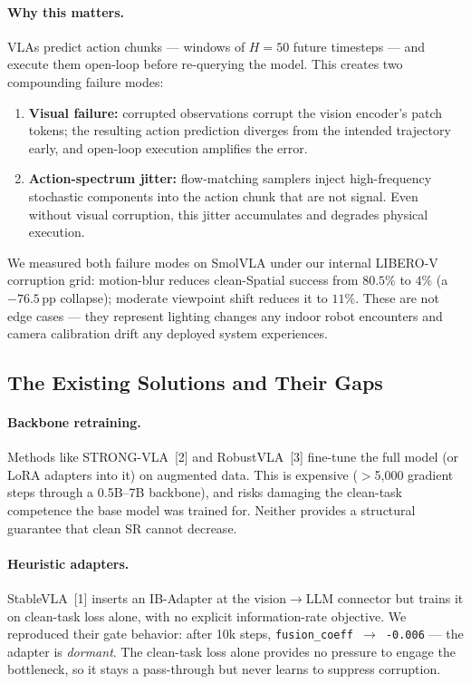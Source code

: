 \documentclass[11pt,a4paper]{article}
\begin{document}
\paragraph{Why this matters.}
VLAs predict action chunks — windows of $H=50$ future timesteps — and execute them
open-loop before re-querying the model. This creates two compounding failure modes:
\begin{enumerate}[nosep]
  \item \textbf{Visual failure:} corrupted observations corrupt the vision encoder's
        patch tokens; the resulting action prediction diverges from the intended
        trajectory early, and open-loop execution amplifies the error.
  \item \textbf{Action-spectrum jitter:} flow-matching samplers inject high-frequency
        stochastic components into the action chunk that are not signal. Even without
        visual corruption, this jitter accumulates and degrades physical execution.
\end{enumerate}

We measured both failure modes on SmolVLA under our internal LIBERO-V corruption grid:
motion-blur reduces clean-Spatial success from $80.5\%$ to $4\%$ (a $-76.5$\,pp collapse);
moderate viewpoint shift reduces it to $11\%$. These are not edge cases — they represent
lighting changes any indoor robot encounters and camera calibration drift any deployed
system experiences.

\subsection{The Existing Solutions and Their Gaps}

\paragraph{Backbone retraining.}
Methods like STRONG-VLA~[2] and RobustVLA~[3]
fine-tune the full model (or LoRA adapters into it) on augmented data. This is expensive
($>$5,000 gradient steps through a 0.5B–7B backbone), and risks damaging the clean-task
competence the base model was trained for. Neither provides a structural guarantee that
clean SR cannot decrease.

\paragraph{Heuristic adapters.}
StableVLA~[1] inserts an IB-Adapter at the vision$\to$LLM connector
but trains it on clean-task loss alone, with no explicit information-rate objective.
We reproduced their gate behavior: after 10k steps, \texttt{fusion\_coeff~$\to$~-0.006}
— the adapter is \emph{dormant}. The clean-task loss alone provides no pressure to engage
the bottleneck, so it stays a pass-through but never learns to suppress corruption.
\end{document}

